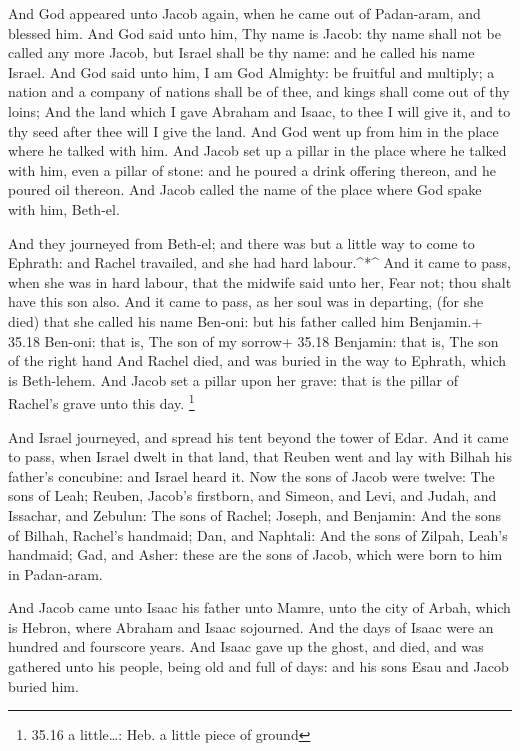 And God appeared unto Jacob again, when he came out of
Padan-aram, and blessed him.  And God said unto him, Thy
name is Jacob: thy name shall not be called any more Jacob, but Israel
shall be thy name: and he called his name Israel.  And God
said unto him, I am God Almighty: be fruitful and multiply; a nation and
a company of nations shall be of thee, and kings shall come out of thy
loins;  And the land which I gave Abraham and Isaac, to
thee I will give it, and to thy seed after thee will I give the land.
 And God went up from him in the place where he talked with
him.  And Jacob set up a pillar in the place where he
talked with him, even a pillar of stone: and he poured a drink offering
thereon, and he poured oil thereon.  And Jacob called the
name of the place where God spake with him, Beth-el.

 And they journeyed from Beth-el; and there was but a
little way to come to Ephrath: and Rachel travailed, and she had hard
labour.\^{}*\^{}  And it came to pass, when she was in hard
labour, that the midwife said unto her, Fear not; thou shalt have this
son also.  And it came to pass, as her soul was in
departing, (for she died) that she called his name Ben-oni: but his
father called him Benjamin.+ 35.18 Ben-oni: that is, The son of my
sorrow+ 35.18 Benjamin: that is, The son of the right hand 
And Rachel died, and was buried in the way to Ephrath, which is
Beth-lehem.  And Jacob set a pillar upon her grave: that is
the pillar of Rachel's grave unto this day. \footnote{35.16 a
  little\ldots: Heb. a little piece of ground}

 And Israel journeyed, and spread his tent beyond the tower
of Edar.  And it came to pass, when Israel dwelt in that
land, that Reuben went and lay with Bilhah his father's concubine: and
Israel heard it. Now the sons of Jacob were twelve:  The
sons of Leah; Reuben, Jacob's firstborn, and Simeon, and Levi, and
Judah, and Issachar, and Zebulun:  The sons of Rachel;
Joseph, and Benjamin:  And the sons of Bilhah, Rachel's
handmaid; Dan, and Naphtali:  And the sons of Zilpah,
Leah's handmaid; Gad, and Asher: these are the sons of Jacob, which were
born to him in Padan-aram.

 And Jacob came unto Isaac his father unto Mamre, unto the
city of Arbah, which is Hebron, where Abraham and Isaac sojourned.
 And the days of Isaac were an hundred and fourscore years.
 And Isaac gave up the ghost, and died, and was gathered
unto his people, being old and full of days: and his sons Esau and Jacob
buried him.

